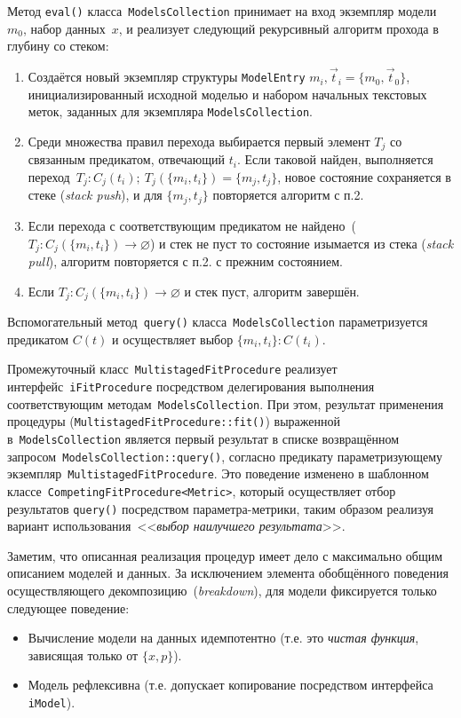 Метод \texttt{eval()} класса~\texttt{ModelsCollection}
принимает на вход экземпляр модели~$m_0$, набор данных~$x$,
и реализует следующий рекурсивный алгоритм прохода в глубину
со стеком:
\begin{enumerate}
    \item Создаётся новый экземпляр структуры \texttt{ModelEntry}
    ${m_i,\vec{t}_i} = \{m_0, \vec{t}_0\}$, инициализированный
    исходной моделью и набором начальных текстовых меток, заданных
    для экземпляра \texttt{ModelsCollection}.
    \item Среди множества правил перехода выбирается первый
    элемент $T_j$ со связанным предикатом, отвечающий $t_i$. Если
    таковой найден, выполняется
    переход~$T_j:C_j(t_i);~T_j(\{m_i,t_i\}) = \{m_j, t_j\}$, новое
    состояние сохраняется в стеке (\emph{stack push}), и для $\{m_j,t_j\}$
    повторяется алгоритм с п.2.
    \item Если перехода с соответствующим предикатом не
    найдено~($T_j:C_j(\{m_i,t_i\})\rightarrow\varnothing$) и
    стек не пуст то состояние изымается из стека (\emph{stack pull}),
    алгоритм повторяется с п.2. с прежним состоянием.
    \item Если $T_j:C_j(\{m_i,t_i\})\rightarrow\varnothing$ и
    стек пуст, алгоритм завершён.
\end{enumerate}

Вспомогательный метод~\texttt{query()} класса~\texttt{ModelsCollection}
параметризуется предикатом $C(t)$ и осуществляет выбор $\{m_i,t_i\}:C(t_i)$.

Промежуточный класс~\texttt{MultistagedFitProcedure} реализует
интерфейс~\texttt{iFitProcedure} посредством делегирования выполнения
соответствующим методам~\texttt{ModelsCollection}. При этом,
результат применения процедуры (\texttt{MultistagedFitProcedure::fit()})
выраженной в~\texttt{ModelsCollection} является первый результат в
списке возвращённом запросом~\texttt{ModelsCollection::query()},
согласно предикату параметризующему экземпляр~\texttt{MultistagedFitProcedure}.
Это поведение изменено в шаблонном
классе~\texttt{CompetingFitProcedure<Metric>}, который осуществляет
отбор результатов \texttt{query()} посредством параметра-метрики,
таким образом реализуя вариант
использования~<<\emph{выбор наилучшего результата}>>.

Заметим, что описанная реализация процедур имеет дело с максимально
общим описанием моделей и данных. За исключением элемента обобщённого
поведения осуществляющего декомпозицию~(\emph{breakdown}), для модели фиксируется
только следующее поведение:
\begin{itemize}
    \item Вычисление модели на данных идемпотентно (т.е. это \emph{чистая функция},
    зависящая только от $\{x, p\}$).
    \item Модель рефлексивна (т.е. допускает копирование посредством
    интерфейса \texttt{iModel}).
\end{itemize}

